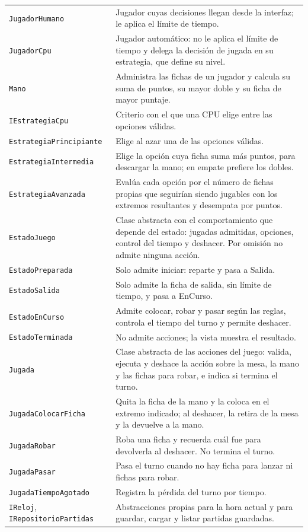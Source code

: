 {\begin{longtable}{@{}L{4.4cm}L{10.1cm}@{}}
  \texttt{JugadorHumano} & Jugador cuyas decisiones llegan desde la interfaz; le aplica el límite de tiempo. \\ \filasep
  \texttt{JugadorCpu} & Jugador automático: no le aplica el límite de tiempo y delega la decisión de jugada en su estrategia, que define su nivel. \\ \filasep
  \texttt{Mano} & Administra las fichas de un jugador y calcula su suma de puntos, su mayor doble y su ficha de mayor puntaje. \\ \filasep
  \texttt{IEstrategiaCpu} & Criterio con el que una CPU elige entre las opciones válidas. \\ \filasep
  \texttt{EstrategiaPrincipiante} & Elige al azar una de las opciones válidas. \\ \filasep
  \texttt{EstrategiaIntermedia} & Elige la opción cuya ficha suma más puntos, para descargar la mano; en empate prefiere los dobles. \\ \filasep
  \texttt{EstrategiaAvanzada} & Evalúa cada opción por el número de fichas propias que seguirían siendo jugables con los extremos resultantes y desempata por puntos. \\ \filasep
  \texttt{EstadoJuego} & Clase abstracta con el comportamiento que depende del estado: jugadas admitidas, opciones, control del tiempo y deshacer. Por omisión no admite ninguna acción. \\ \filasep
  \texttt{EstadoPreparada} & Solo admite iniciar: reparte y pasa a Salida. \\ \filasep
  \texttt{EstadoSalida} & Solo admite la ficha de salida, sin límite de tiempo, y pasa a EnCurso. \\ \filasep
  \texttt{EstadoEnCurso} & Admite colocar, robar y pasar según las reglas, controla el tiempo del turno y permite deshacer. \\ \filasep
  \texttt{EstadoTerminada} & No admite acciones; la vista muestra el resultado. \\ \filasep
  \texttt{Jugada} & Clase abstracta de las acciones del juego: valida, ejecuta y deshace la acción sobre la mesa, la mano y las fichas para robar, e indica si termina el turno. \\ \filasep
  \texttt{JugadaColocarFicha} & Quita la ficha de la mano y la coloca en el extremo indicado; al deshacer, la retira de la mesa y la devuelve a la mano. \\ \filasep
  \texttt{JugadaRobar} & Roba una ficha y recuerda cuál fue para devolverla al deshacer. No termina el turno. \\ \filasep
  \texttt{JugadaPasar} & Pasa el turno cuando no hay ficha para lanzar ni fichas para robar. \\ \filasep
  \texttt{JugadaTiempoAgotado} & Registra la pérdida del turno por tiempo. \\ \filasep
  \texttt{IReloj}, \texttt{IRepositorioPartidas} & Abstracciones propias para la hora actual y para guardar, cargar y listar partidas guardadas. \\
\end{longtable}}

